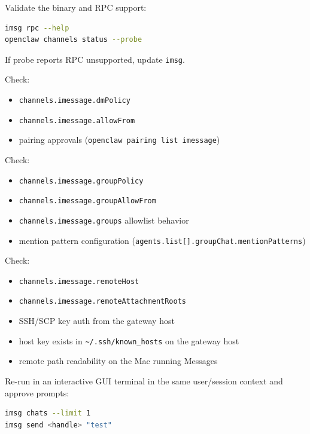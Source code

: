 Validate the binary and RPC support:

\begin{lstlisting}[language=bash]
imsg rpc --help
openclaw channels status --probe
\end{lstlisting}


If probe reports RPC unsupported, update \texttt{imsg}.


Check:

\begin{itemize}
  \item \texttt{channels.imessage.dmPolicy}
  \item \texttt{channels.imessage.allowFrom}
  \item pairing approvals (\texttt{openclaw pairing list imessage})
\end{itemize}



Check:

\begin{itemize}
  \item \texttt{channels.imessage.groupPolicy}
  \item \texttt{channels.imessage.groupAllowFrom}
  \item \texttt{channels.imessage.groups} allowlist behavior
  \item mention pattern configuration (\texttt{agents.list[].groupChat.mentionPatterns})
\end{itemize}



Check:

\begin{itemize}
  \item \texttt{channels.imessage.remoteHost}
  \item \texttt{channels.imessage.remoteAttachmentRoots}
  \item SSH/SCP key auth from the gateway host
  \item host key exists in \texttt{\textasciitilde{}/.ssh/known\_hosts} on the gateway host
  \item remote path readability on the Mac running Messages
\end{itemize}



Re-run in an interactive GUI terminal in the same user/session context and approve prompts:

\begin{lstlisting}[language=bash]
imsg chats --limit 1
imsg send <handle> "test"
\end{lstlisting}


